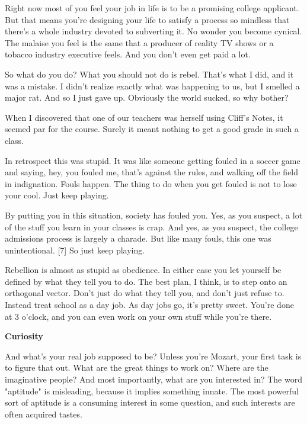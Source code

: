 Right now most of you feel your job in life is
                  to be a promising college applicant. But that means you're
                  designing your life to satisfy a process so mindless that
                  there's a whole industry devoted to subverting it. No wonder
                  you become cynical. The malaise you feel is the same that a
                  producer of reality TV shows or a tobacco industry executive
                  feels. And you don't even get paid a lot.

So what
                  do you do? What you should not do is rebel. That's what I did,
                  and it was a mistake. I didn't realize exactly what was
                  happening to us, but I smelled a major rat. And so I just gave
                  up. Obviously the world sucked, so why bother?

When
                  I discovered that one of our teachers was herself using
                  Cliff's Notes, it seemed par for the course. Surely it meant
                  nothing to get a good grade in such a class.

In
                  retrospect this was stupid. It was like someone getting fouled
                  in a soccer game and saying, hey, you fouled me, that's
                  against the rules, and walking off the field in indignation.
                  Fouls happen. The thing to do when you get fouled is not to
                  lose your cool. Just keep playing.
                  

By putting you in this situation,
                  society has fouled you. Yes, as you suspect, a lot of the
                  stuff you learn in your classes is crap. And yes, as you
                  suspect, the college admissions process is largely a charade.
                  But like many fouls, this one was unintentional. [7] So just
                  keep playing.

Rebellion is almost as stupid as
                  obedience. In either case you let yourself be defined by what
                  they tell you to do. The best plan, I think, is to step onto
                  an orthogonal vector. Don't just do what they tell you, and
                  don't just refuse to. Instead treat school as a day job. As
                  day jobs go, it's pretty sweet. You're done at 3 o'clock, and
                  you can even work on your own stuff while you're there.

\textbf{Curiosity}

And what's your real job supposed to be? Unless
                  you're Mozart, your first task is to figure that out. What are
                  the great things to work on? Where are the imaginative people?
                  And most importantly, what are you interested in? The word
                  "aptitude" is misleading, because it implies something innate.
                  The most powerful sort of aptitude is a consuming interest in
                  some question, and such interests are often acquired
                  tastes.

